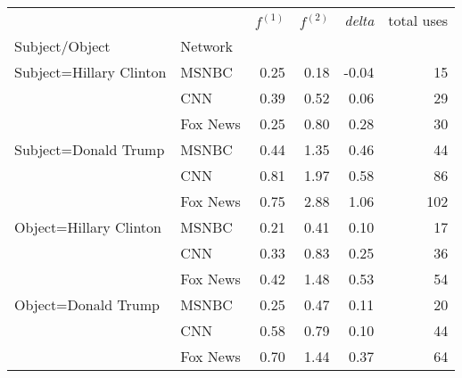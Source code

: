 \begin{tabular}{llrrrr}
\toprule
                    &     & $f^{(1)}$ & $f^{(2)}$ & \emph{delta} & total uses \\
Subject/Object & Network &           &           &            &            \\
\midrule
Subject=Hillary Clinton & MSNBC &      0.25 &      0.18 &      -0.04 &         15 \\
                    & CNN &      0.39 &      0.52 &       0.06 &         29 \\
                    & Fox News &      0.25 &      0.80 &       0.28 &         30 \\
\hline
Subject=Donald Trump & MSNBC &      0.44 &      1.35 &       0.46 &         44 \\
                    & CNN &      0.81 &      1.97 &       0.58 &         86 \\
                    & Fox News &      0.75 &      2.88 &       1.06 &        102 \\
\hline
Object=Hillary Clinton & MSNBC &      0.21 &      0.41 &       0.10 &         17 \\
                    & CNN &      0.33 &      0.83 &       0.25 &         36 \\
                    & Fox News &      0.42 &      1.48 &       0.53 &         54 \\
\hline
Object=Donald Trump & MSNBC &      0.25 &      0.47 &       0.11 &         20 \\
                    & CNN &      0.58 &      0.79 &       0.10 &         44 \\
                    & Fox News &      0.70 &      1.44 &       0.37 &         64 \\
\bottomrule
\end{tabular}
